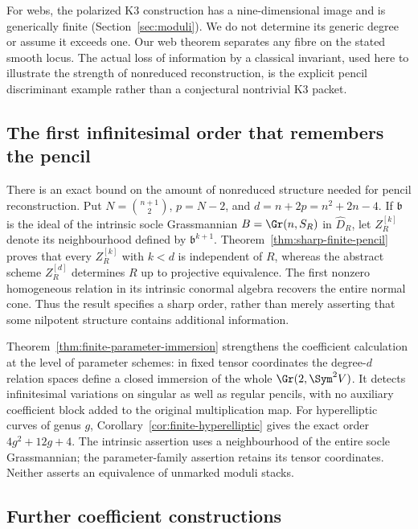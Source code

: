 For webs, the polarized K3 construction has a nine-dimensional image
and is generically finite (Section~\ref{sec:moduli}).  We do not
determine its generic degree or assume it exceeds one.  Our web
theorem separates any fibre on the stated smooth locus.  The actual
loss of information by a classical invariant, used here to illustrate
the strength of nonreduced reconstruction, is the explicit pencil
discriminant example rather than a conjectural nontrivial K3 packet.


\subsection{The first infinitesimal order that remembers the pencil}

There is an exact bound on the amount of nonreduced structure needed
for pencil reconstruction.  Put \(N=\binom{n+1}{2}\),
\(p=N-2\), and \(d=n+2p=n^2+2n-4\).  If
\(\mathfrak b\) is the ideal of the intrinsic socle Grassmannian
\(B=\Gr(n,S_R)\) in \(\widehat D_R\), let
\(Z_R^{[k]}\) denote its neighbourhood defined by
\(\mathfrak b^{k+1}\).  Theorem~\ref{thm:sharp-finite-pencil}
proves that every \(Z_R^{[k]}\) with \(k<d\) is independent
of \(R\), whereas the abstract scheme \(Z_R^{[d]}\)
determines \(R\) up to projective equivalence.  The first
nonzero homogeneous relation in its intrinsic conormal algebra
recovers the entire normal cone.  Thus the result specifies a sharp
order, rather than merely asserting that some nilpotent structure
contains additional information.

Theorem~\ref{thm:finite-parameter-immersion} strengthens the
coefficient calculation at the level of parameter schemes: in fixed
tensor coordinates the degree-\(d\) relation spaces define a
closed immersion of the whole \(\Gr(2,\Sym^2V)\).
It detects infinitesimal variations on singular as well as regular
pencils, with no auxiliary coefficient block added to the original
multiplication map.  For hyperelliptic curves of genus \(g\),
Corollary~\ref{cor:finite-hyperelliptic} gives the exact order
\(4g^2+12g+4\).  The intrinsic assertion uses a neighbourhood
of the entire socle Grassmannian; the parameter-family assertion
retains its tensor coordinates.  Neither asserts an equivalence
of unmarked moduli stacks.

\subsection{Further coefficient constructions}

